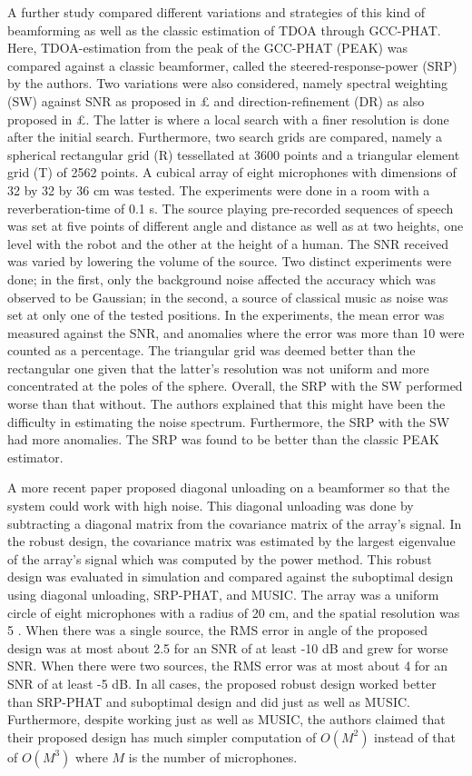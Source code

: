 \documentclass{report}
\begin{document}
A further study \cite{badali_evaluating_2009} compared different variations and strategies of this kind of beamforming as well as the classic estimation of TDOA through GCC-PHAT. Here, TDOA-estimation from the peak of the GCC-PHAT (PEAK) was compared against a classic beamformer, called the steered-response-power (SRP) by the authors. Two variations were also considered, namely spectral weighting (SW) against SNR as proposed in £ and direction-refinement (DR) as also proposed in £. The latter is where a local search with a finer resolution is done after the initial search. Furthermore, two search grids are compared, namely a spherical rectangular grid (R) tessellated at 3600 points and a triangular element grid (T) of 2562 points. A cubical array of eight microphones with dimensions of 32 by 32 by 36 \si{cm} was tested. The experiments were done in a room with a reverberation-time of 0.1 \si{s}. The source playing pre-recorded sequences of speech was set at five points of different angle and distance as well as at two heights, one level with the robot and the other at the height of a human. The SNR received was varied by lowering the volume of the source. Two distinct experiments were done; in the first, only the background noise affected the accuracy which was observed to be Gaussian; in the second, a source of classical music as noise was set at only one of the tested positions. In the experiments, the mean error was measured against the SNR, and anomalies where the error was more than 10 \si{\deg} were counted as a percentage. The triangular grid was deemed better than the rectangular one given that the latter's resolution was not uniform and more concentrated at the poles of the sphere. Overall, the SRP with the SW performed worse than that without. The authors explained that this might have been the difficulty in estimating the noise spectrum. Furthermore, the SRP with the SW had more anomalies. The SRP was found to be better than the classic PEAK estimator.

A more recent paper \cite{salvati_power_2019} proposed diagonal unloading on a beamformer so that the system could work with high noise. This diagonal unloading was done by subtracting a diagonal matrix from the covariance matrix of the array's signal. In the robust design, the covariance matrix was estimated by the largest eigenvalue of the array's signal which was computed by the power method. This robust design was evaluated in simulation and compared against the suboptimal design using diagonal unloading, SRP-PHAT, and MUSIC. The array was a uniform circle of eight microphones with a radius of 20 \si{cm}, and the spatial resolution was 5 \si{\deg}. When there was a single source, the RMS error in angle of the proposed design was at most about 2.5 \si{\deg} for an SNR of at least -10 \si{dB} and grew for worse SNR. When there were two sources, the RMS error was at most about 4 \si{\deg} for an SNR of at least -5 \si{dB}. In all cases, the proposed robust design worked better than SRP-PHAT and suboptimal design and did just as well as MUSIC. Furthermore, despite working just as well as MUSIC, the authors claimed that their proposed design has much simpler computation of $O(M^2)$ instead of that of $O(M^3)$ where $M$ is the number of microphones.
\end{document}
